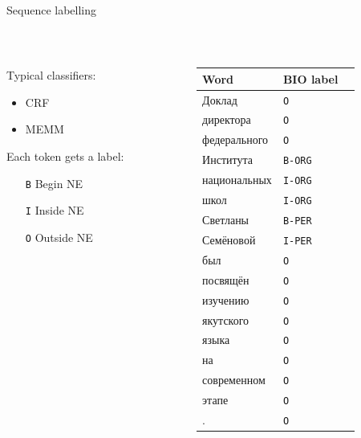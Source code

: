 \documentclass[10pt, compress]{beamer}
\begin{document}
\begin{frame}{Sequence labelling}

~\\

\begin{columns}
\begin{column}{0.48\textwidth}
Typical classifiers:
\begin{itemize}
\item CRF
\item MEMM
\end{itemize}

Each token gets a label:
\begin{itemize}
\item [{\tt B}] Begin NE
\item [{\tt I}] Inside NE
\item [{\tt O}] Outside NE
\end{itemize}
\end{column}
\begin{column}{0.48\textwidth}
{\small 
\begin{tabular}{lll}
\textbf{Word} & \textbf{BIO label} \\
\hline
Доклад & {\tt O} \\
директора & {\tt O} \\
федерального & {\tt O} \\
Института & {\tt B-ORG} \\
национальных & {\tt I-ORG} \\
школ & {\tt I-ORG} \\
Светланы & {\tt B-PER} \\
Семёновой & {\tt I-PER} \\
был & {\tt O} \\
посвящён & {\tt O} \\
изучению & {\tt O} \\
якутского & {\tt O} \\
языка & {\tt O} \\
на & {\tt O} \\
современном & {\tt O} \\
этапе & {\tt O} \\
. & {\tt O} \\
\end{tabular}
}
\end{column}

\end{columns}
\end{frame}

\end{document}

